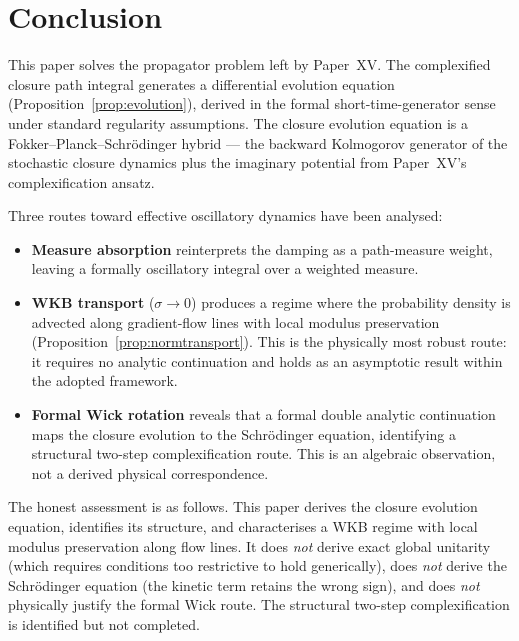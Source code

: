 \documentclass[12pt]{article}
\begin{document}
\section{Conclusion}\label{sec:conclusion}

This paper solves the propagator problem left by Paper~XV. The complexified closure path integral generates a differential evolution equation (Proposition~\ref{prop:evolution}), derived in the formal short-time-generator sense under standard regularity assumptions. The closure evolution equation is a Fokker--Planck--Schr\"odinger hybrid --- the backward Kolmogorov generator of the stochastic closure dynamics plus the imaginary potential from Paper~XV's complexification ansatz.

Three routes toward effective oscillatory dynamics have been analysed:
\begin{itemize}
    \item \textbf{Measure absorption} reinterprets the damping as a path-measure weight, leaving a formally oscillatory integral over a weighted measure.
    \item \textbf{WKB transport} ($\sigma \to 0$) produces a regime where the probability density is advected along gradient-flow lines with local modulus preservation (Proposition~\ref{prop:normtransport}). This is the physically most robust route: it requires no analytic continuation and holds as an asymptotic result within the adopted framework.
    \item \textbf{Formal Wick rotation} reveals that a formal double analytic continuation maps the closure evolution to the Schr\"odinger equation, identifying a structural two-step complexification route. This is an algebraic observation, not a derived physical correspondence.
\end{itemize}

The honest assessment is as follows. This paper derives the closure evolution equation, identifies its structure, and characterises a WKB regime with local modulus preservation along flow lines. It does \textit{not} derive exact global unitarity (which requires conditions too restrictive to hold generically), does \textit{not} derive the Schr\"odinger equation (the kinetic term retains the wrong sign), and does \textit{not} physically justify the formal Wick route. The structural two-step complexification is identified but not completed.
\end{document}
